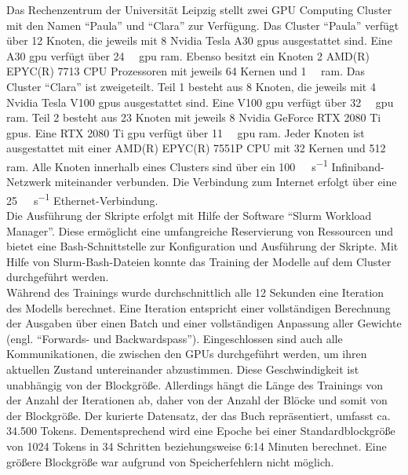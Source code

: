 Das Rechenzentrum der Universität Leipzig stellt zwei GPU Computing Cluster mit den Namen \enquote{Paula} und \enquote{Clara} zur Verfügung.
Das Cluster \enquote{Paula} verfügt über 12 Knoten, die jeweils mit 8 Nvidia Tesla A30 \ac{gpu}s ausgestattet sind.
Eine A30 \ac{gpu} verfügt über \SI{24}{\giga\byte} \ac{gpu} \ac{ram}.
Ebenso besitzt ein Knoten 2 AMD(R) EPYC(R) 7713 CPU Prozessoren mit jeweils 64 Kernen und \SI{1}{\tera\byte} \ac{ram}.
Das Cluster \enquote{Clara} ist zweigeteilt.
Teil 1 besteht aus 8 Knoten, die jeweils mit 4 Nvidia Tesla V100 \ac{gpu}s ausgestattet sind. Eine V100 \ac{gpu} verfügt über \SI{32}{\giga\byte} \ac{gpu} \ac{ram}.
Teil 2 besteht aus 23 Knoten mit jeweils 8 Nvidia GeForce RTX 2080 Ti \ac{gpu}s. Eine RTX 2080 Ti \ac{gpu} verfügt über \SI{11}{\giga\byte} \ac{gpu} \ac{ram}.
Jeder Knoten ist ausgestattet mit einer AMD(R) EPYC(R) 7551P CPU mit 32 Kernen und \SI{512}{\giga\byte} \ac{ram}.
Alle Knoten innerhalb eines Clusters sind über ein \SI{100}{\giga\bit\per\second} Infiniband-Netzwerk miteinander verbunden.
Die Verbindung zum Internet erfolgt über eine \SI{25}{\giga\bit\per\second} Ethernet-Verbindung.\\

Die Ausführung der Skripte erfolgt mit Hilfe der Software \enquote{Slurm Workload Manager}.
Diese ermöglicht eine umfangreiche Reservierung von Ressourcen und bietet eine Bash-Schnittstelle zur Konfiguration und Ausführung der Skripte.
Mit Hilfe von Slurm-Bash-Dateien konnte das Training der Modelle auf dem Cluster durchgeführt werden.\\

Während des Trainings wurde durchschnittlich alle 12 Sekunden eine Iteration des Modells berechnet.
Eine Iteration entspricht einer vollständigen Berechnung der Ausgaben über einen Batch und einer vollständigen Anpassung aller Gewichte (engl. \enquote{Forwards- und Backwardspass}).
Eingeschlossen sind auch alle Kommunikationen, die zwischen den GPUs durchgeführt werden, um ihren aktuellen Zustand untereinander abzustimmen.
Diese Geschwindigkeit ist unabhängig von der Blockgröße.
Allerdings hängt die Länge des Trainings von der Anzahl der Iterationen ab, daher von der Anzahl der Blöcke und somit von der Blockgröße.
Der kurierte Datensatz, der das Buch \citet{bb} repräsentiert, umfasst ca. 34.500 Tokens.
Dementsprechend wird eine Epoche bei einer Standardblockgröße von 1024 Tokens in 34 Schritten beziehungsweise 6:14 Minuten berechnet.
Eine größere Blockgröße war aufgrund von Speicherfehlern nicht möglich.\\

